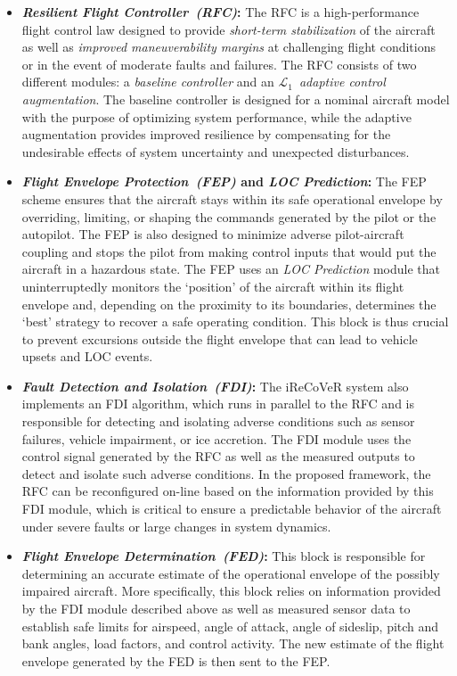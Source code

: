 \documentclass[letter,onecolumn,12pt]{aiaa-tc}
\newcommand{\Lone}{\mathcal{L}_1}
\begin{document}
\begin{itemize}
\setlength{\itemsep}{-1pt}
\vspace{-1mm}


\item \textbf{\emph{Resilient Flight Controller~(RFC)}:} The RFC is a high-performance flight control law designed to provide \emph{short-term stabilization} of the aircraft as well as \emph{improved maneuverability margins} at challenging flight conditions or in the event of moderate faults and failures. The RFC consists of two different modules: a \emph{baseline controller} and an $\Lone$~\emph{adaptive control augmentation}. The baseline controller is designed for a nominal aircraft model with the purpose of optimizing system performance, while the adaptive augmentation provides improved resilience by compensating for the undesirable effects of system uncertainty and unexpected disturbances.


\item \textbf{\emph{Flight Envelope Protection~(FEP)} and \emph{LOC Prediction}:} The FEP scheme ensures that the aircraft stays within its safe operational envelope by overriding, limiting, or shaping the commands generated by the pilot or the autopilot. The FEP is also designed to minimize adverse pilot-aircraft coupling and stops the pilot from making control inputs that would put the aircraft in a hazardous state. The FEP uses an \emph{LOC Prediction} module that uninterruptedly monitors the `position' of the aircraft within its flight envelope and, depending on the proximity to its boundaries, determines the `best' strategy to recover a safe operating condition. This block is thus crucial to prevent excursions outside the flight envelope that can lead to vehicle upsets and LOC events.


\item \textbf{\emph{Fault Detection and Isolation~(FDI)}:} The iReCoVeR system also implements an FDI algorithm, which runs in parallel to the RFC and is responsible for detecting and isolating adverse conditions such as sensor failures, vehicle impairment, or ice accretion. The FDI module uses the control signal generated by the RFC as well as the measured outputs to detect and isolate such adverse conditions. In the proposed framework, the RFC can be reconfigured on-line based on the information provided by this FDI module, which is critical to ensure a predictable behavior of the aircraft under severe faults or large changes in system dynamics.


\item \textbf{\emph{Flight Envelope Determination~(FED)}:} This block is responsible for determining an accurate estimate of the operational envelope of the possibly impaired aircraft. More specifically, this block relies on information provided by the FDI module described above as well as measured sensor data to establish safe limits for airspeed, angle of attack, angle of sideslip, pitch and bank angles, load factors, and control activity. The new estimate of the flight envelope generated by the FED is then sent to the FEP.

\end{itemize}
\end{document}
